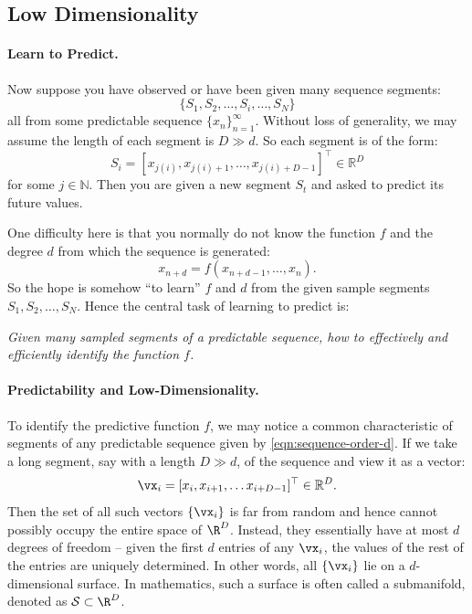 \documentclass[../../book-main.tex]{subfiles}
\begin{document}
\subsection{Low Dimensionality}\label{sec:intro-low-dimensionality}
\paragraph{Learn to Predict.}
Now suppose you have observed or have been given many sequence segments:
\begin{equation}
    \{S_1, S_2, \ldots, S_i, \ldots, S_N\}
\end{equation}
all from some predictable sequence $\{x_n\}_{n=1}^\infty$. Without loss of generality, we may assume the length of each segment is $D \gg d$. So each segment is of the form:
\begin{equation}
    S_i = [x_{j(i)}, x_{j(i)+1}, \ldots, x_{j(i)+D-1}]^\top \in \mathbb{R}^D
\end{equation}
for some $j \in \mathbb{N}$. Then you are given a new segment $S_t$ and asked to predict its future values. 

One difficulty here is that you normally do not know the function $f$ and the degree $d$ from which the sequence is generated: 
\begin{equation}
    x_{n+d} = f(x_{n+d-1}, \ldots,  x_{n}).
\label{eqn:sequence-order-d}
\end{equation}
So the hope is somehow ``to learn'' $f$ and $d$ from the given sample segments $S_1, S_2, \ldots, S_N$. Hence the central task of learning to predict is:
\begin{center}
{\em Given many sampled segments of a predictable sequence, how to effectively and efficiently identify the function $f$.}
\end{center}

\paragraph{Predictability and Low-Dimensionality.}
To identify the predictive function $f$, we may notice a common characteristic of segments of any predictable sequence given by \eqref{eqn:sequence-order-d}. If we take a long segment, say with a length $D \gg d$, of the sequence and view it as a vector: 
\begin{equation}
    \vx_i = [x_i, x_{i+1}, \ldots x_{i+D-1}]^\top \in \mathbb{R}^D.
\end{equation}
Then the set of all such vectors $\{\vx_i\}$ is far from random and hence cannot possibly occupy the entire space of $\R^D$. Instead, they essentially have at most $d$ degrees of freedom -- given the first $d$ entries of any $\vx_i$, the values of the rest of the entries are uniquely determined. In other words, all $\{\vx_i\}$ lie on a $d$-dimensional surface. In mathematics, such a surface is often called a submanifold, denoted as $\mathcal{S} \subset \R^D$.
\end{document}
